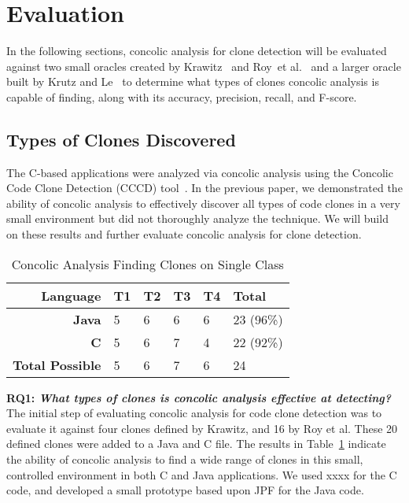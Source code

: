 \documentclass{sig-alternate}
\newif\ifisnopii
\begin{document}
\section{Evaluation}
\label{sec: evaluation}


In the following sections, concolic analysis for clone detection will be evaluated against two small oracles created by Krawitz~\cite{Kraw2012} and Roy~et al.~\cite{Roy:2009:CEC:1530898.1531101} and a larger oracle built by Krutz and Le~\cite{Krutz:2014:CCO:2597073.2597127} to determine what types of clones concolic analysis is capable of finding, along with its accuracy, precision, recall, and F-score.



\subsection{Types of Clones Discovered} %

The C-based applications were analyzed via concolic analysis using the Concolic Code Clone Detection (CCCD) tool~\cite{wcre2013,Dan123}. In the previous paper, we demonstrated the ability of concolic analysis to effectively discover all types of code clones in a very small environment but did not thoroughly analyze the technique. We will build on these results and further evaluate concolic analysis for clone detection.

\begin{table}[thb!]
\begin{center}
\caption{Concolic Analysis Finding Clones on Single Class}
\label{table:singleclasscomparisionexample}
\begin{tabular}{r||l|l|l|l|l}
\bfseries Language & \bfseries T1 & \bfseries T2 & \bfseries T3 & \bfseries  T4 & \bfseries  Total \\ \hline\hline
 \bfseries  Java  & 5 & 6 & 6 & 6  & 23 (96\%)\\
  \hline
\bfseries  C  & 5 & 6 & 7 & 4  & 22 (92\%)\\

  \hline
\bfseries Total Possible & 5 & 6 & 7 & 6 & 24 \\ %
\end{tabular}
\end{center}
\end{table}

\textbf{RQ1: \emph{What types of clones is concolic analysis effective at detecting?}}
The initial step of evaluating concolic analysis for code clone detection was to evaluate it against four clones defined by Krawitz, and 16 by Roy et al. These 20 defined clones were added to a Java and C file. The results in Table~\ref{table:singleclasscomparisionexample} indicate the ability of concolic analysis to find a wide range of clones in this small, controlled environment in both C and Java applications. We used \ifisnopii CCCD \else xxxx \fi for the C code, and developed a small prototype based upon JPF for the Java code.
\end{document}
